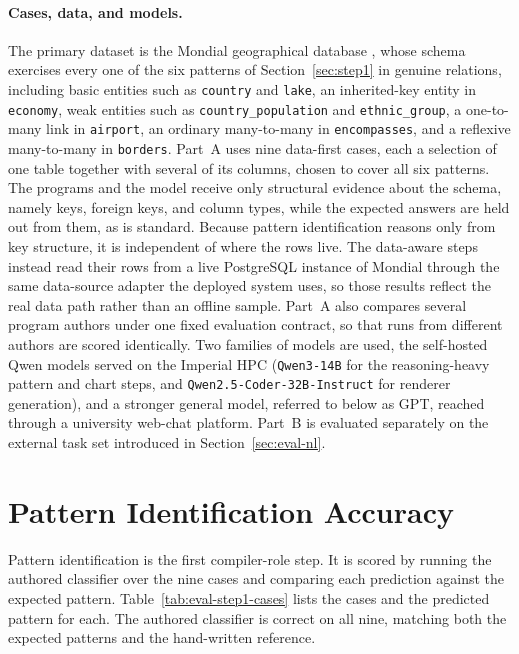 \paragraph{Cases, data, and models.} The primary dataset is the Mondial geographical database \cite{mondial}, whose schema exercises every one of the six patterns of Section~\ref{sec:step1} in genuine relations, including basic entities such as \texttt{country} and \texttt{lake}, an inherited-key entity in \texttt{economy}, weak entities such as \texttt{country\_population} and \texttt{ethnic\_group}, a one-to-many link in \texttt{airport}, an ordinary many-to-many in \texttt{encompasses}, and a reflexive many-to-many in \texttt{borders}. Part~A uses nine data-first cases, each a selection of one table together with several of its columns, chosen to cover all six patterns. The programs and the model receive only structural evidence about the schema, namely keys, foreign keys, and column types, while the expected answers are held out from them, as is standard. Because pattern identification reasons only from key structure, it is independent of where the rows live. The data-aware steps instead read their rows from a live PostgreSQL instance of Mondial through the same data-source adapter the deployed system uses, so those results reflect the real data path rather than an offline sample. Part~A also compares several program authors under one fixed evaluation contract, so that runs from different authors are scored identically. Two families of models are used, the self-hosted Qwen models served on the Imperial HPC (\texttt{Qwen3-14B} for the reasoning-heavy pattern and chart steps, and \texttt{Qwen2.5-Coder-32B-Instruct} for renderer generation), and a stronger general model, referred to below as GPT, reached through a university web-chat platform. Part~B is evaluated separately on the external task set introduced in Section~\ref{sec:eval-nl}.

\section{Pattern Identification Accuracy}
\label{sec:eval-step1}

Pattern identification is the first compiler-role step. It is scored by running the authored classifier over the nine cases and comparing each prediction against the expected pattern. Table~\ref{tab:eval-step1-cases} lists the cases and the predicted pattern for each. The authored classifier is correct on all nine, matching both the expected patterns and the hand-written reference.

